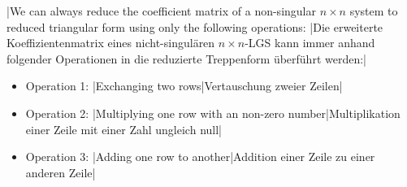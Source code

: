 %


\vsp

\begin{tcolorbox}[colback=white]
\begin{theorem}
\tr|We can always reduce the coefficient matrix of a non-singular $n\times n$ system to reduced triangular form using only the following operations:
   |Die erweiterte Koeffizientenmatrix eines nicht-singulären $n\times n$-LGS kann immer anhand folgender Operationen in die reduzierte Treppenform überführt werden:|
\begin{itemize}
\item Operation 1: \tr|Exchanging two rows|Vertauschung zweier Zeilen|
\item Operation 2: \tr|Multiplying one row with an non-zero number|Multiplikation einer Zeile mit einer Zahl ungleich null|
\item Operation 3: \tr|Adding one row to another|Addition einer Zeile zu einer anderen Zeile|
\end{itemize}
\end{theorem}
\end{tcolorbox}



